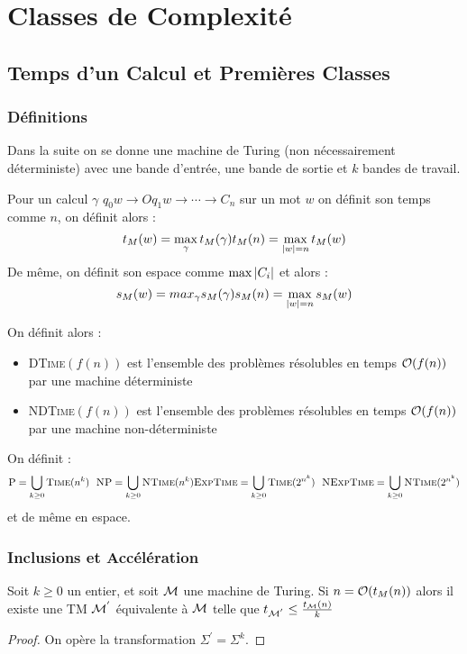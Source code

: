 \documentclass{cours}
\begin{document}
\section{Classes de Complexité}
\subsection{Temps d'un Calcul et Premières Classes}
\subsubsection{Définitions}
Dans la suite on se donne une machine de Turing (non nécessairement déterministe) avec une bande d'entrée, une bande de sortie et $k$ bandes de travail.
\begin{definition}
    Pour un calcul $\gamma$ $q_{0}w \rightarrow Oq_{1}w \rightarrow \cdots \rightarrow C_{n}$ sur un mot $w$ on définit son temps comme $n$, on définit alors : \[t_{M}(w) = \max_{\gamma} t_{M}(\gamma)\\ t_{M}(n) = \max_{\left|w\right| = n}t_{M}(w)\]
    De même, on définit son espace comme $\max{\left|C_{i}\right|}$ et alors : 
    \[
        s_{M}(w) = max_{\gamma} s_{M}(\gamma)\\
        s_{M}(n) = \max_{\left|w\right| = n}s_{M}(w)
    \]
\end{definition}

On définit alors :
\begin{definition}
    \begin{itemize}
        \item \textsc{DTime}$(f(n))$ est l'ensemble des problèmes résolubles en temps $\mathcal{O}(f(n))$ par une machine déterministe
        \item \textsc{NDTime}$(f(n))$ est l'ensemble des problèmes résolubles en temps $\mathcal{O}(f(n))$ par une machine non-déterministe
    \end{itemize}
\end{definition}

\begin{definition}
    On définit :
    \[
        \textsc{P} = \bigcup_{k \geq 0} \textsc{Time}(n^{k}) \ \    \textsc{NP} = \bigcup_{k \geq 0} \textsc{NTime}(n^{k})\\
        \textsc{ExpTime} = \bigcup_{k \geq 0} \textsc{Time}(2^{n^{k}}) \ \ \textsc{NExpTime} = \bigcup_{k \geq 0} \textsc{NTime}(2^{n^{k}})
    \]
    et de même en espace.
\end{definition}

\subsubsection{Inclusions et Accélération}
\begin{theorem}
    Soit $k \geq 0$ un entier, et soit $\mathcal{M}$ une machine de Turing. Si $n = \mathcal{O}(t_{M}(n))$ alors il existe une TM $\mathcal{M}^{'}$ équivalente à $\mathcal{M}$ telle que $t_{\mathcal{M}^{'}} \leq \frac{t_{\mathcal{M}}(n)}{k}$
\end{theorem}
\begin{proof}
    On opère la transformation $\Sigma^{'} = \Sigma^{k}$.
\end{proof}
\end{document}
